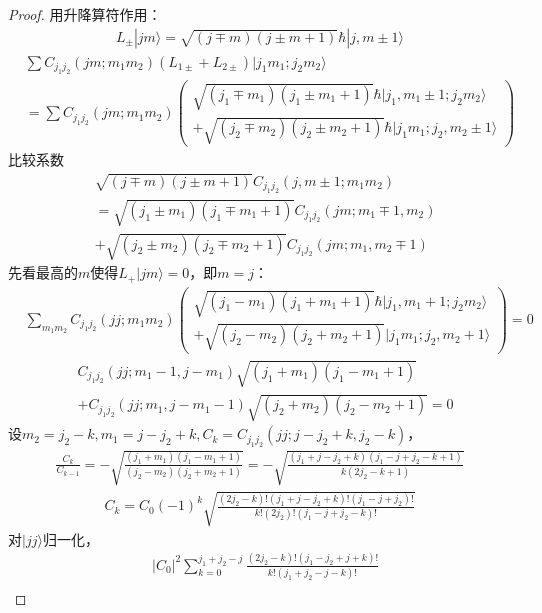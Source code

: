 \begin{proof}
用升降算符作用：
\begin{align*}
    L_{\pm}|jm\rangle  = \sqrt{(j\mp m)(j\pm m +1)}\hbar|j,m\pm1\rangle
\end{align*}
\begin{align*}
    &\sum C_{j_1j_2}(j m;m_1 m_2)(L_{1\pm} + L_{2\pm})|j_1 m_1;j_2 m_2\rangle\\
    &=\sum C_{j_1j_2}(j m;m_1 m_2)\left(\begin{matrix}\sqrt{(j_1\mp m_1)(j_1\pm m_1 +1)}\hbar|j_1, m_1\pm1;j_2 m_2\rangle\\
    +\sqrt{(j_2\mp m_2)(j_2\pm m_2 +1)}\hbar|j_1 m_1;j_2,m_2\pm1\rangle\end{matrix}\right)
\end{align*}
比较系数
\begin{align*}
    &\sqrt{(j\mp m)(j\pm m +1)}C_{j_1j_2}(j, m\pm1;m_1 m_2)\\
    &= \sqrt{(j_1\pm m_1)(j_1\mp m_1 +1)}C_{j_1j_2}(jm;m_1\mp1, m_2)\\ 
    &+ \sqrt{(j_2\pm m_2)(j_2\mp m_2 +1)}C_{j_1j_2}(j m;m_1, m_2\mp1)
\end{align*}
先看最高的$m$使得$L_{+}|jm\rangle = 0$，即$m=j$：
\begin{align*}
    &\sum_{m_1 m_2}C_{j_1j_2}(j j;m_1 m_2) \left(\begin{matrix}
    \sqrt{(j_1-m_1)(j_1+m_1+1)}\hbar|j_1, m_1+1;j_2 m_2\rangle\\
    + \sqrt{(j_2-m_2)(j_2+m_2+1)}|j_1 m_1;j_2,m_2+1\rangle\end{matrix}\right) = 0
\end{align*}
\begin{align*}
    &C_{j_1j_2}(j j;m_1-1,j-m_1)\sqrt{(j_1+m_1)(j_1-m_1+1)} \\
    &+C_{j_1j_2}(j j;m_1,j-m_1-1)\sqrt{(j_2+m_2)(j_2-m_2+1)} = 0
\end{align*}
设$m_2 = j_2 - k, m_1 = j - j_2 + k,C_k = C_{j_1j_2}(jj;j-j_2+k,j_2-k)$，
\begin{align*}
    \frac{C_k}{C_{k-1}} = -\sqrt{\frac{(j_1+m_1)(j_1-m_1+1)}{(j_2-m_2)(j_2+m_2+1)}}=-\sqrt{\frac{(j_1+j - j_2 + k)(j_1-j + j_2 - k+1)}{k(2j_2-k+1)}}
\end{align*}
\begin{align*}
    C_k = C_0 (-1)^k \sqrt{\frac{(2j_2-k)!(j_1+j-j_2+k)!(j_1-j+j_2)!}{k!(2j_2)!(j_1-j+j_2-k)!}}
\end{align*}
对$|jj\rangle$归一化，
\begin{align*}
    &|C_0|^2\sum_{k=0}^{j_1+j_2-j}\frac{(2j_2-k)!(j_1-j_2+j+k)!}{k!(j_1+j_2-j-k)!} \\

\end{align*}
\end{proof}
